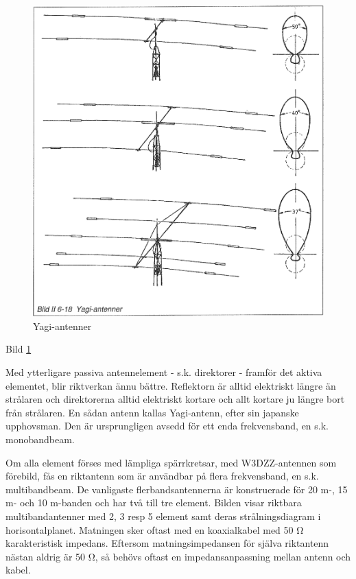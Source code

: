 \begin{figure}
  \includegraphics[width=\textwidth]{images/bild_2_6-18}
  \caption{Yagi-antenner}
  \label{fig:bildII6-18}
\end{figure}

Bild \ref{fig:bildII6-18}

Med ytterligare passiva antennelement - s.k. direktorer - framför det
aktiva elementet, blir riktverkan ännu bättre. Reflektorn är alltid
elektriskt längre än strålaren och direktorerna alltid elektriskt
kortare och allt kortare ju längre bort från strålaren. En sådan
antenn kallas Yagi-antenn, efter sin japanske upphovsman. Den är
ursprungligen avsedd för ett enda frekvensband, en s.k. monobandbeam.

Om alla element förses med lämpliga spärrkretsar, med W3DZZ-antennen
som förebild, fås en riktantenn som är användbar på flera
frekvensband, en s.k. multibandbeam. De vanligaste flerbandsantennerna
är konstruerade för 20 m-, 15 m- och 10 m-banden och har två till tre
element.  Bilden visar riktbara multibandantenner med 2, 3 resp 5
element samt deras strålningsdiagram i horisontalplanet.  Matningen
sker oftast med en koaxialkabel med 50 Ω karakteristisk
impedans. Eftersom matningsimpedansen för själva riktantenn nästan
aldrig är 50 Ω, så behövs oftast en impedansanpassning mellan antenn
och kabel.

